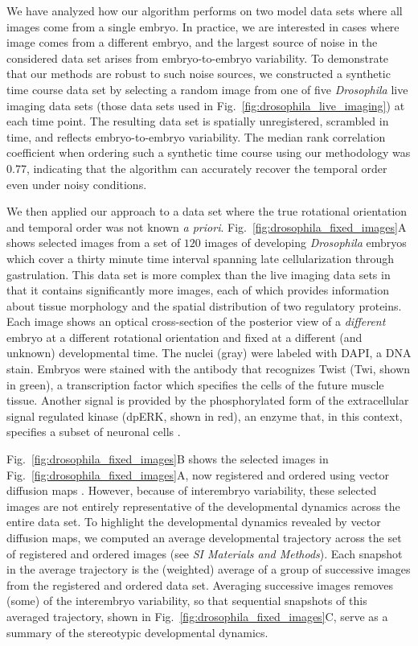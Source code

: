 \documentclass[twocolumn, 10pt]{article}
\newcommand{\SI}[0]{\textit{SI Materials and Methods}}
\newcommand{\fig}[0]{Fig.}
\begin{document}
We have analyzed how our algorithm performs on two model data sets where all images come from a single embryo. 
%
In practice, we are interested in cases where image comes from a different embryo, and the largest source of noise in the considered data set arises from embryo-to-embryo variability.
%
To demonstrate that our methods are robust to such noise sources,
we constructed a synthetic time course data set by selecting a random image from one of five {\em Drosophila} live imaging data sets (those data sets used in \fig~\ref{fig:drosophila_live_imaging}) at each time point.
%
The resulting data set is spatially unregistered, scrambled in time, and reflects embryo-to-embryo variability. 
%
The median rank correlation coefficient when ordering such a synthetic time course using our methodology was 0.77, indicating that the algorithm can accurately recover the temporal order even under noisy conditions. 

We then applied our approach to a data set where the true rotational orientation and temporal order was not known {\it a priori}.
%
\fig~\ref{fig:drosophila_fixed_images}A shows selected images from a set of $120$ images of developing {\em Drosophila} embryos which cover a thirty minute time interval spanning late cellularization through gastrulation.
%
This data set is more complex than the live imaging data sets in that it contains significantly more images, each of which provides information about tissue morphology and the spatial distribution of two regulatory proteins.
%
Each image shows an optical cross-section of the posterior view of a {\em different} embryo at a different rotational orientation and fixed at a different (and unknown) developmental time.
%
The nuclei (gray) were labeled with DAPI, a DNA stain.
%
Embryos were stained with the antibody that recognizes Twist (Twi, shown in green), a transcription factor which specifies the cells of the future muscle tissue.
%
Another signal is provided by the phosphorylated form of the extracellular signal regulated kinase (dpERK, shown in red), an enzyme that, in this context, specifies a subset of neuronal cells \citep{Lim2013kinetics}.

\fig~\ref{fig:drosophila_fixed_images}B shows the selected images in \fig~\ref{fig:drosophila_fixed_images}A, now registered and ordered using vector diffusion maps \citep{singer2012vector}.
%
However, because of interembryo variability, these selected images are not entirely representative of the developmental dynamics across the entire data set.
%
To highlight the developmental dynamics revealed by vector diffusion maps, we computed an average developmental trajectory across the set of registered and ordered images (see \SI). 
%
Each snapshot in the average trajectory is the (weighted) average of a group of successive images from the registered and ordered data set.
%
Averaging successive images removes (some) of the interembryo variability, so that sequential snapshots of this averaged trajectory, shown in \fig~\ref{fig:drosophila_fixed_images}C, serve as a summary of the stereotypic developmental dynamics.
\end{document}
